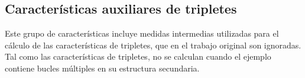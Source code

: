 %
%
\subsection{Características auxiliares de tripletes}
%
Este grupo de características incluye medidas intermedias utilizadas
para el cálculo de las características de tripletes, que en el trabajo
original \cite{xue} son ignoradas. Tal como las características de tripletes,
no se calculan cuando el ejemplo contiene bucles múltiples en su estructura
secundaria.
